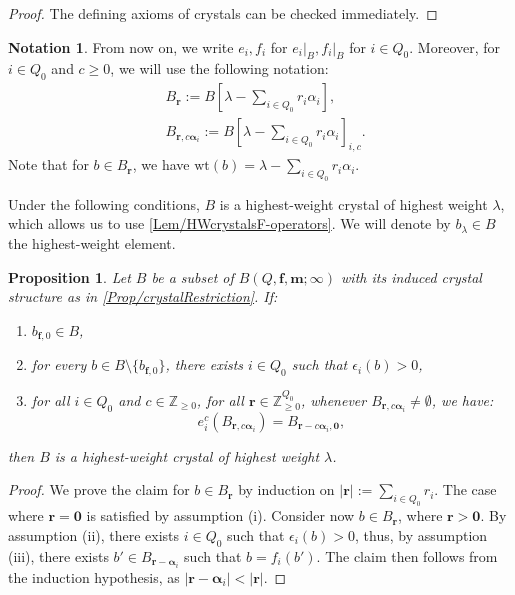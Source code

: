 \documentclass[a4paper,12pt]{article}
\theoremstyle{definition}
\newtheorem{notation}[definition]{Notation}
\theoremstyle{plain}
\newtheorem{proposition}[definition]{Proposition}
\theoremstyle{remark}
\newcommand\bbZ{\mathbb{Z}}
\newcommand\bfalpha{\bm{\alpha}}
\newcommand\bff{\mathbf{f}}
\newcommand\bfm{\mathbf{m}}
\newcommand\bfr{\mathbf{r}}
\begin{document}
\begin{proof}
The defining axioms of crystals can be checked immediately.
\end{proof}

\begin{notation}\label{notation for weight shift}
From now on, we write $e_i,f_i$ for $e_i\vert_B,f_i\vert_B$ for $i\in Q_0$. Moreover, for $i\in Q_0$ and $c\geq0$, we will use the following notation:
\begin{align*}
& B_{\bfr} := B\left[\lambda-\sum_{i\in Q_0}r_i\alpha_i\right] , \\
& B_{\bfr,c\bfalpha_i} :=B\left[\lambda-\sum_{i\in Q_0}r_i\alpha_i\right]_{i,c}.
\end{align*}
Note that for $b \in B_\bfr$, we have $\mathrm{wt}(b) = \lambda - \sum_{i \in Q_0} r_i \alpha_i$.
\end{notation}

Under the following conditions, $B$ is a highest-weight crystal of highest weight $\lambda$, which allows us to use \cref{Lem/HWcrystalsF-operators}. We will denote by $b_\lambda\in B$ the highest-weight element.

\begin{proposition}\label{Prop/HWcrystalRestriction}
Let $B$ be a subset of $B(Q,\bff,\bfm;\infty)$ with its induced crystal structure as in \cref{Prop/crystalRestriction}. If:
\begin{enumerate}[label=(\roman*)]
\item $b_{\bff,0}\in B$,
\item for every $b\in B\setminus\{b_{\bff,0}\}$, there exists $i\in Q_0$ such that $\epsilon_i(b)>0$,
\item\label{Item3/Prop/HWcrystalRestriction} for all $i\in Q_0$ and $c\in\bbZ_{\geq0}$, for all $\bfr\in\bbZ_{\geq0}^{Q_0}$, whenever $B_{\bfr,c\bfalpha_i}\ne\emptyset$, we have:
\[
e_i^c(B_{\bfr,c\bfalpha_i})=B_{\bfr-c\bfalpha_i,\mathbf{0}},
\]
\end{enumerate}
then $B$ is a highest-weight crystal of highest weight $\lambda$.
\end{proposition}

\begin{proof}
We prove the claim for $b\in B_\bfr$ by induction on $\vert\bfr\vert:=\sum_{i\in Q_0}r_i$. The case where $\bfr=\mathbf{0}$ is satisfied by assumption (i). Consider now $b\in B_\bfr$, where $\bfr>\mathbf{0}$. By assumption (ii), there exists $i\in Q_0$ such that $\epsilon_i(b)>0$, thus, by assumption (iii), there exists $b'\in B_{\bfr-\bfalpha_i}$ such that $b=f_i(b')$. The claim then follows from the induction hypothesis, as $\vert\bfr-\bfalpha_i\vert<\vert\bfr\vert$.
\end{proof}
\end{document}
